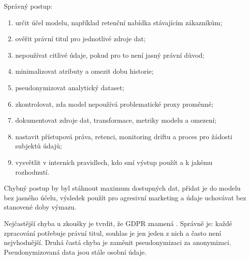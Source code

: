 Správný postup:
\begin{enumerate}
  \item určit účel modelu, například retenční nabídka stávajícím zákazníkům;
  \item ověřit právní titul pro jednotlivé zdroje dat;
  \item nepoužívat citlivé údaje, pokud pro to není jasný právní důvod;
  \item minimalizovat atributy a omezit dobu historie;
  \item pseudonymizovat analytický dataset;
  \item zkontrolovat, zda model nepoužívá problematické proxy proměnné;
  \item dokumentovat zdroje dat, transformace, metriky modelu a omezení;
  \item nastavit přístupová práva, retenci, monitoring driftu a proces pro žádosti subjektů údajů;
  \item vysvětlit v interních pravidlech, kdo smí výstup použít a k jakému rozhodnutí.
\end{enumerate}

Chybný postup by byl stáhnout maximum dostupných dat, přidat je do modelu bez jasného účelu, výsledek
použít pro agresivní marketing a údaje uchovávat bez stanovené doby výmazu.

\pozor
Nejčastější chyba u zkoušky je tvrdit, že GDPR znamená . Správně je:
každé zpracování potřebuje právní titul, souhlas je jen jeden z nich a často není nejvhodnější. Druhá
častá chyba je zaměnit pseudonymizaci za anonymizaci. Pseudonymizovaná data jsou stále osobní údaje.

